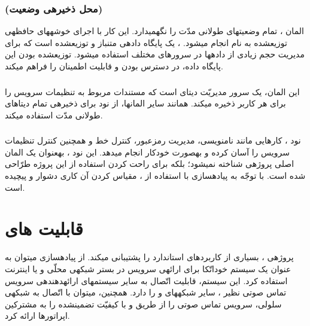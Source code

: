 \subsubsection{ (محل ذخیره\nf ی وضعیت)}
\label{vellum}
المان ، تمام وضعیت\nf های طولانی مدّت را نگه\nf می\nf دارد. این کار با اجرای خوشه\nf های حافظه\nf ی توزیع\nf شده به نام  انجام می\nf شود. ، یک پایگاه داده\nf ی متن\nf باز و توزیع\nf شده است که برای مدیریت حجم   زیادی از داده\nf ها در سرورهای مختلف استفاده می\nf شود. توزیع\nf شده بودن این پایگاه داده، در دسترس بودن و قابلیت اطمینان را فراهم می\nf کند\cite{cassandra}.

\subsubsection{}

این المان، یک سرور مدیریّت دیتای  است که مستندات مربوط به تنظیمات سرویس  را برای هر کاربر ذخیره می\nf کند. همانند سایر المان\nf ها،  از نود  برای ذخیره\nf ی تمام دیتاهای طولانی مدّت استفاده می\nf کند. 


\subsubsection{}

نود ، کارهایی مانند نام\nf نویسی، مدیریت رمزعبور، کنترل خط و همچنین کنترل تنظیمات سرویس  را آسان کرده و به\nf صورت خودکار انجام می\nf دهد. این نود ، به\nf عنوان یک المان اصلی پروژه\nf ی  شناخته نمی\nf شود؛ بلکه برای راحت کردن استفاده از این پروژه طرّاحی شده است. با توجّه به پیاده\nf سازی  با استفاده از ، مقیاس کردن آن کاری دشوار و پیچیده است. 


\section{قابلیت های }


 پروژه\nf ی ، بسیاری از کاربردهای استاندارد  را پشتیبانی می\nf کند. از پیاده\nf سازی  می\nf توان به عنوان یک سیستم خوداتّکا برای ارائه\nf ی سرویس  در بستر شبکه\nf ی محلّی و یا اینترنت استفاده کرد. این سیستم، قابلیت اتّصال به سایر سیستم\nf های ارائه\nf دهنده\nf ی سرویس تماس صوتی نظیر ، سایر شبکه\nf های  و  را دارد. همچنین، می\nf توان با اتّصال  به شبکه\nf ی سلولی، سرویس تماس صوتی را از طریق  و با کیفیّت تضمین\nf شده را به مشترکین اپراتورها ارائه کرد.

